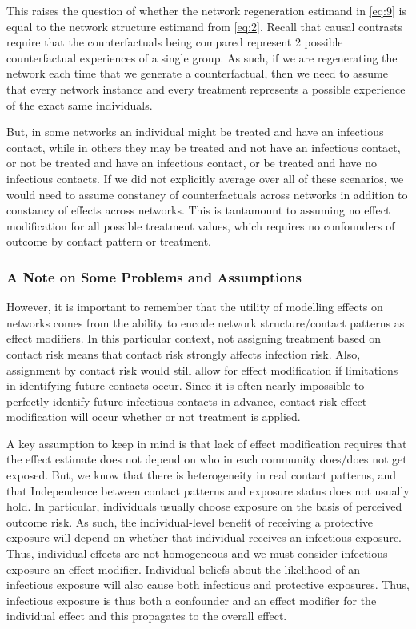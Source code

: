 \documentclass{article}
\theoremstyle{definition}
\begin{document}
This raises the question of whether the network regeneration estimand in \ref{eq:9}  is equal to the network structure estimand from \ref{eq:2}. Recall that causal contrasts require that the counterfactuals being compared represent 2 possible counterfactual experiences of a single group. As such, if we are regenerating the network each time that we generate a counterfactual, then we need to assume that every network instance and every treatment represents a possible experience of the exact same individuals. 

But, in some networks an individual might be treated and have an infectious contact, while in others they may be treated and not have an infectious contact, or not be treated and have an infectious contact, or be treated and have no infectious contacts. If we did not explicitly average over all of these scenarios, we would need to assume constancy of counterfactuals across networks in addition to constancy of effects across networks. This is tantamount to assuming no effect modification for all possible treatment values, which requires no confounders of outcome by contact pattern or treatment.
\subsubsection{A Note on Some Problems and Assumptions}

However, it is important to remember that the utility of modelling effects on networks comes from the ability to encode network structure/contact patterns as effect modifiers. In this particular context, not assigning treatment based on contact risk means that contact risk strongly affects infection risk. Also, assignment by contact risk would still allow for effect modification if limitations in identifying future contacts occur. Since it is often nearly impossible to perfectly identify future infectious contacts in advance, contact risk effect modification will occur whether or not treatment is applied.

A key assumption to keep in mind is that lack of effect modification requires that the effect estimate does not depend on who in each community does/does not get exposed. But, we know that there is heterogeneity in real contact patterns, and that Independence between contact patterns and exposure status does not usually hold. In particular, individuals usually choose exposure on the basis of perceived outcome risk. As such, the individual-level benefit of receiving a protective exposure will depend on whether that individual receives an infectious exposure. Thus, individual effects are not homogeneous and we must consider infectious exposure an effect modifier. Individual beliefs about the likelihood of an infectious exposure will also cause both infectious and protective exposures. Thus, infectious exposure is thus both a confounder and an effect modifier for the individual effect and this propagates to the overall effect. 
\end{document}
